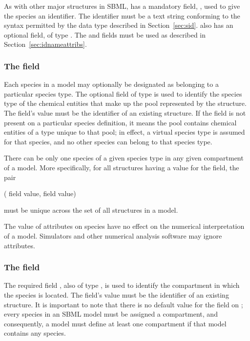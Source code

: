 As with other major structures in SBML, \Species has a mandatory
field, , used to give the species an identifier.  The
identifier must be a text string conforming to the syntax
permitted by the  data type described in
Section~\ref{sec:sid}.  \Species also has an optional 
field, of type .  The  and 
fields must be used as described in
Section~\ref{sec:idnameattribs}.



\subsubsection{The  field}
\label{sec:species-species-type}

Each species in a model may optionally be designated as belonging
to a particular species type.  The optional field
 of type  is used to identify the
species type of the chemical entities that make up the pool
represented by the \Species structure. The field's value must be
the identifier of an existing \SpeciesType structure.  If the
 field is not present on a particular species
definition, it means the pool contains chemical entities of a type
unique to that pool; in effect, a virtual species type is assumed
for that species, and no other species can belong to that species
type.

There can be only one species of a given species type in any given
compartment of a model.  More specifically, for all \Species
structures having a value for the  field, the
pair
\begin{center}
( field value,  field value)
\end{center}
must be unique across the set of all \Species structures
in a model.

The value of  attributes on species have no
effect on the numerical interpretation of a model. Simulators and
other numerical analysis software may ignore 
attributes.




\subsubsection{The  field}
\label{sec:species-compartment}

The required field , also of type
, is used to identify the compartment in which the
species is located.  The field's value must be the identifier of
an existing \Compartment structure.  It is important to note that
there is no default value for the  field on
\Species; every species in an SBML model must be assigned a
compartment, and consequently, a model must define at least one
compartment if that model contains any species.


